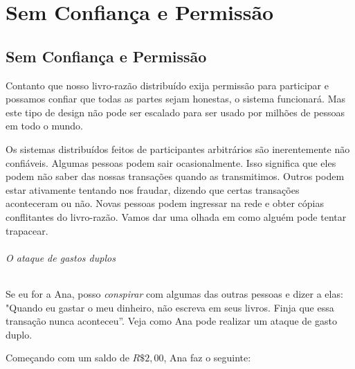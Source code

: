 \part{Sem Confiança e Permissão}
\label{ch:capitulo3}
\chapter*{Sem Confiança e Permissão}

Contanto que nosso livro-razão distribuído exija permissão para participar e possamos confiar que todas as partes sejam honestas, o sistema funcionará. Mas este tipo de design não pode ser escalado para ser usado por milhões de pessoas em todo o mundo.

Os sistemas distribuídos feitos de participantes arbitrários são inerentemente não confiáveis. Algumas pessoas podem sair ocasionalmente. Isso significa que eles podem não saber das nossas transações quando as transmitimos. Outros podem estar ativamente tentando nos fraudar, dizendo que certas transações aconteceram ou não. Novas pessoas podem ingressar na rede e obter cópias conflitantes do livro-razão. Vamos dar uma olhada em como alguém pode tentar trapacear.%

\paragraph{O ataque de gastos duplos}
\paragraph{}

Se eu for a Ana, posso \textit{conspirar} com algumas das outras pessoas e dizer a elas: "Quando eu gastar o meu dinheiro, não escreva em seus livros. Finja que essa transação nunca aconteceu”. Veja como Ana pode realizar um ataque de gasto duplo.

Começando com um saldo de $R\$2,00$, Ana faz o seguinte:

